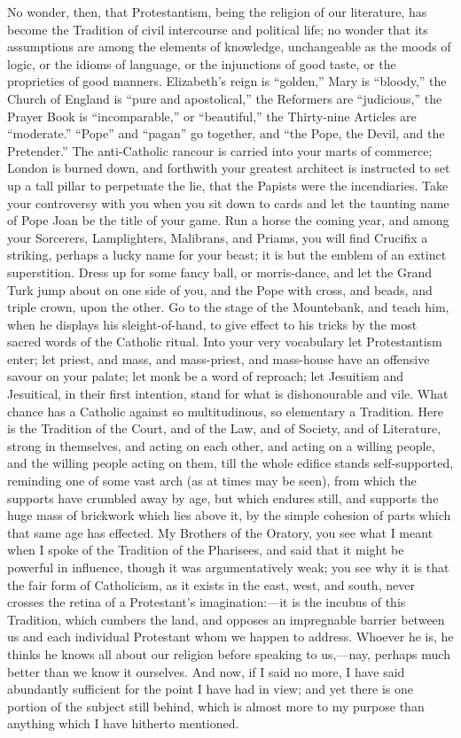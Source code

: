 No wonder, then, that Protestantism, being the
religion of our literature, has become the Tradition of
civil intercourse and political life; no wonder that its
assumptions are among the elements of knowledge,
unchangeable as the moods of logic, or the idioms of
language, or the injunctions of good taste, or the
proprieties of good manners. Elizabeth's reign is
``golden,'' Mary is ``bloody,'' the
Church of England is ``pure and apostolical,''
the Reformers are ``judicious,'' the Prayer Book
is ``incomparable,'' or ``beautiful,''
the Thirty-nine Articles are ``moderate.''
``Pope'' and ``pagan'' go together, and
``the Pope, the Devil, and the Pretender.'' The
anti-Catholic rancour is carried into your marts of
commerce; London is burned down, and forthwith your
greatest architect is instructed to set up a tall pillar
to perpetuate the lie, that the Papists were the
incendiaries. Take your controversy with you when you sit
down to cards and let the taunting name of Pope Joan be
the title of your game. Run a horse the coming year, and
among your Sorcerers, Lamplighters, Malibrans, and
Priams, you will find Crucifix a striking, perhaps a
lucky name for your beast; it is but the emblem of an
extinct superstition. Dress up for some fancy ball, or
morris-dance, and let the Grand Turk jump about on one
side of you, and the Pope with cross, and beads, and
triple crown, upon the other. Go to the stage of the
Mountebank, and teach him, when he displays his
sleight-of-hand, to give effect to his tricks by the most
sacred words of the Catholic ritual. Into your very
vocabulary let Protestantism enter; let priest, and mass,
and mass-priest, and mass-house have an offensive savour
on your palate; let monk be a word of reproach; let
Jesuitism and Jesuitical, in their first intention, stand
for what is dishonourable and vile. What chance has a
Catholic against so multitudinous, so elementary a
Tradition. Here is the Tradition of the Court, and of the
Law, and of Society, and of Literature, strong in
themselves, and acting on each other, and acting on a
willing people, and the willing people acting on them,
till the whole edifice stands self-supported, reminding
one of some vast arch (as at times may be seen), from
which the supports have crumbled away by age, but which
endures still, and supports the huge mass of brickwork
which lies above it, by the simple cohesion of parts
which that same age has effected. My Brothers of the
Oratory, you see what I meant when I spoke of the
Tradition of the Pharisees, and said that it might be
powerful in influence, though it was argumentatively
weak; you see why it is that the fair form of
Catholicism, as it exists in the east, west, and south,
never crosses the retina of a Protestant's
imagination:—it is the incubus of this Tradition,
which cumbers the land, and opposes an impregnable
barrier between us and each individual Protestant whom we
happen to address. Whoever he is, he thinks he knows all
about our religion before speaking to us,—nay,
perhaps much better than we know it ourselves. And now,
if I said no more, I have said abundantly sufficient for
the point I have had in view; and yet there is one
portion of the subject still behind, which is almost more
to my purpose than anything which I have hitherto
mentioned.

